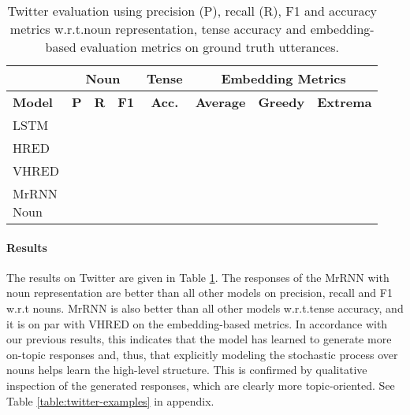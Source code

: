 \documentclass{article}
\begin{document}
\begin{table}[t]
  \caption{Twitter evaluation using precision (P), recall (R), F1 and accuracy metrics w.r.t.\@ noun representation, tense accuracy and embedding-based evaluation metrics on ground truth utterances.} \label{table:TwitterResults}
  \small
  \centering
    \begin{tabular}{lccccccc}
    \toprule
     & \multicolumn{3}{c}{\textbf{Noun}} & \textbf{Tense} & \multicolumn{3}{c}{\textbf{Embedding Metrics}} \\ \midrule
    \textbf{Model} & \textbf{P\@} & \textbf{R\@} & \textbf{F1} & \textbf{Acc.\@} & \textbf{Average} & \textbf{Greedy} & \textbf{Extrema} \\
    \midrule
        \parbox[c][2.65em][c]{0.085\textwidth}{LSTM} &  &  &  &  &  &  &  \\
        \parbox[c][2.65em][c]{0.085\textwidth}{HRED} &  &  &  &  &  &  &  \\
        \parbox[c][2.65em][c]{0.085\textwidth}{VHRED} &  &  &  &  &  &  &  \\       
        \parbox[c][2.65em][c]{0.085\textwidth}{MrRNN \\ Noun} &  &  &  &  &  &  &  \\ \bottomrule
    \end{tabular}
\end{table}






\paragraph{Results} 

The results on Twitter are given in Table \ref{table:TwitterResults}.
The responses of the MrRNN with noun representation are better than all other models on precision, recall and F1 w.r.t nouns.
MrRNN is also better than all other models w.r.t.\@ tense accuracy, and it is on par with VHRED on the embedding-based metrics.
In accordance with our previous results, this indicates that the model has learned to generate more on-topic responses and, thus, that explicitly modeling the stochastic process over nouns helps learn the high-level structure.
This is confirmed by qualitative inspection of the generated responses,
which are clearly more topic-oriented. 
See Table \ref{table:twitter-examples} in appendix.



 
\end{document}
